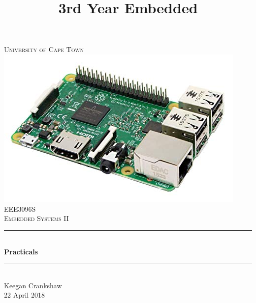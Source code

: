 \title{3rd Year Embedded}

\begin{titlepage}
	\centering
	\vspace*{0.5 cm}
	
	\textsc{\LARGE University of Cape Town}\\[2.0 cm]	%
	\includegraphics[scale = 0.5]{Figures/rpi.jpg}\\[1 cm]	%
	\textsc{\Large EEE3096S}\\[0.5 cm]				%
	\textsc{\large Embedded Systems II}\\[0.5 cm]				%
	\rule{\linewidth}{0.2 mm} \\[0.4 cm]
	{ \huge \bfseries Practicals}\\
	\rule{\linewidth}{0.2 mm} \\[1.5 cm]
	
	Keegan Crankshaw
	\\[2 cm]
	
	{\large 22 April 2018}\\[2 cm]
	
	\vfill
	
\end{titlepage}